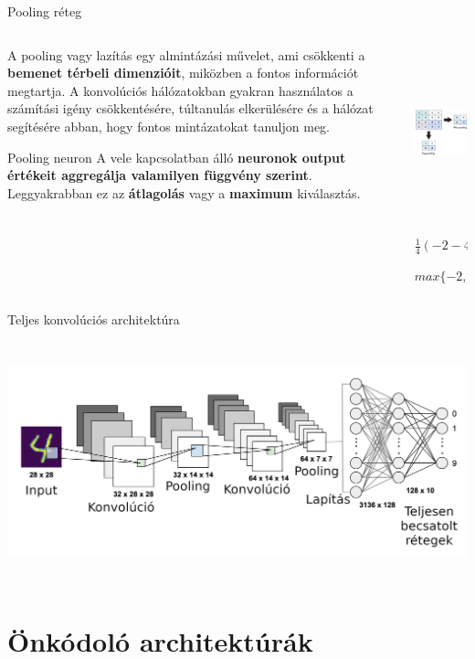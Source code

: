 \documentclass[english, aspectratio=169]{beamer}
\makeatletter
\let\origtableofcontents=\tableofcontents
\def\tableofcontents{\@ifnextchar[{\origtableofcontents}{\gobbletableofcontents}}
\def\gobbletableofcontents#1{\origtableofcontents}
\makeatother
\begin{document}
\begin{frame}{Pooling réteg}
\begin{columns}
\begin{column}{.5\textwidth}
A pooling vagy lazítás egy almintázási művelet, ami csökkenti a \textbf{bemenet térbeli dimenzióit}, miközben a fontos információt megtartja. A konvolúciós hálózatokban gyakran használatos a számítási igény csökkentésére, túltanulás elkerülésére és a hálózat segítésére abban, hogy fontos mintázatokat tanuljon meg.\par\smallskip
\begin{block}{Pooling neuron}
A vele kapcsolatban álló \textbf{neuronok output értékeit aggregálja valamilyen függvény szerint}. Leggyakrabban ez az \textbf{átlagolás} vagy a \textbf{maximum} kiválasztás.
\end{block}
\end{column}
\begin{column}{.5\textwidth}
\begin{center}
\includegraphics[height=5cm, width=7cm, keepaspectratio]{images/dl_6.png}
\end{center}
$\frac{1}{4}(-2 -4 +14 -11)=-1$\par\smallskip
$max\{-2, -4, 14, -11\}=14$
\end{column}
\end{columns}
\end{frame}

\begin{frame}{Teljes konvolúciós architektúra}
\begin{center}
\includegraphics[height=7cm, width=14cm, keepaspectratio]{images/dl_7.png}
\end{center}
\end{frame}

\section{Önkódoló architektúrák}

\begin{frame}
\tableofcontents[currentsection]
\end{frame}
\end{document}
